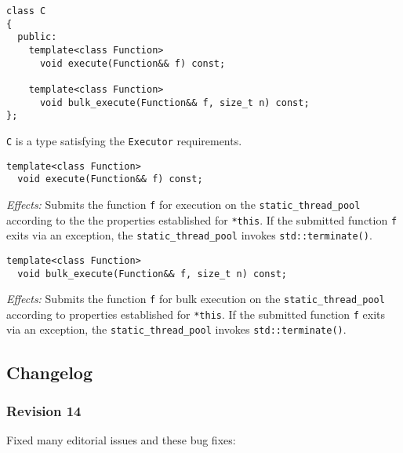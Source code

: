 \documentclass[a4paper,12pt,notitlepage,twoside,openright]{article}
\begin{document}
\begin{verbatim}
class C
{
  public:
    template<class Function>
      void execute(Function&& f) const;

    template<class Function>
      void bulk_execute(Function&& f, size_t n) const;
};
\end{verbatim}

\texttt{C} is a type satisfying the
\texttt{Executor} requirements.

\begin{verbatim}
template<class Function>
  void execute(Function&& f) const;
\end{verbatim}

\emph{Effects:} Submits the function \texttt{f} for
execution on the \texttt{static_thread_pool} according to
the the properties established for \texttt{*this}. If the
submitted function \texttt{f} exits via an exception, the
\texttt{static_thread_pool} invokes
\texttt{std::terminate()}.

\begin{verbatim}
template<class Function>
  void bulk_execute(Function&& f, size_t n) const;
\end{verbatim}

\emph{Effects:} Submits the function \texttt{f} for bulk
execution on the \texttt{static_thread_pool} according to
properties established for \texttt{*this}. If the submitted
function \texttt{f} exits via an exception, the
\texttt{static_thread_pool} invokes
\texttt{std::terminate()}.

\hypertarget{changelog}{%
\subsection{Changelog}\label{changelog}}

\hypertarget{revision-14}{%
\subsubsection{Revision 14}\label{revision-14}}

Fixed many editorial issues and these bug fixes:
\end{document}
